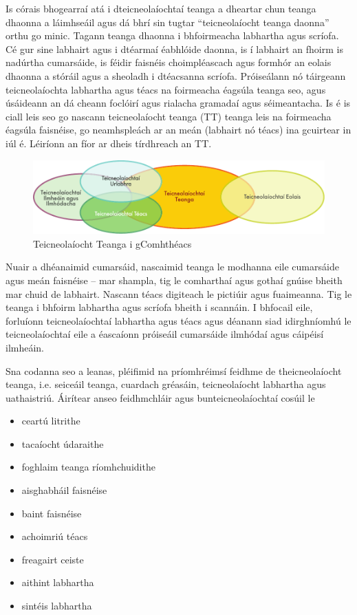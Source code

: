 \begin{multicols}{2}

Is córais bhogearraí atá i dteicneolaíochtaí teanga a dheartar chun teanga dhaonna a láimhseáil agus dá bhrí sin tugtar ``teicneolaíocht teanga daonna'' orthu go minic. Tagann teanga dhaonna i bhfoirmeacha labhartha agus scríofa. Cé gur sine labhairt agus i dtéarmaí éabhlóide daonna, is í labhairt an fhoirm is nadúrtha cumarsáide, is féidir faisnéis choimpléascach agus formhór an eolais dhaonna a stóráil agus a sheoladh i dtéacsanna scríofa. Próiseálann nó táirgeann teicneolaíochta labhartha agus téacs na foirmeacha éagsúla teanga seo,  agus úsáideann an dá cheann foclóirí agus rialacha gramadaí agus séimeantacha. Is é is ciall leis seo go nascann teicneolaíocht teanga (TT) teanga leis na foirmeacha éagsúla faisnéise, go neamhspleách ar an meán (labhairt nó téacs) ina gcuirtear in iúl é. Léiríonn an fíor ar dheis tírdhreach an TT.

\begin{figure}[htb]
  \center
  \includegraphics[width=\textwidth]{../_media/irish/language_technologies}
  \caption{Teicneolaíocht Teanga i gComhthéacs}
  \label{fig:ltincontext_de}
\end{figure}

Nuair a dhéanaimid cumarsáid, nascaimid teanga le modhanna eile cumarsáide agus meán faisnéise – mar shampla, tig le comharthaí agus gothaí gnúise bheith mar chuid de labhairt. Nascann téacs digiteach le pictiúir agus fuaimeanna. Tig le teanga i bhfoirm labhartha agus scríofa bheith i scannáin. I bhfocail eile, forluíonn teicneolaíochtaí labhartha agus téacs agus déanann siad idirghníomhú le teicneolaíochtaí eile a éascaíonn próiseáil cumarsáide ilmhódaí agus cáipéisí ilmheáin. 

Sna codanna seo a leanas, pléifimid na príomhréimsí feidhme de theicneolaíocht teanga, i.e. seiceáil teanga, cuardach gréasáin, teicneolaíocht labhartha agus uathaistriú. Áirítear anseo feidhmchláir agus bunteicneolaíochtaí cosúil le

\begin{itemize}
\item ceartú litrithe
\item tacaíocht údaraithe
\item foghlaim teanga ríomhchuidithe
\item aisghabháil faisnéise
\item baint faisnéise
\item achoimriú téacs
\item freagairt ceiste
\item aithint labhartha 
\item sintéis labhartha
\end{itemize}


\end{multicols}

